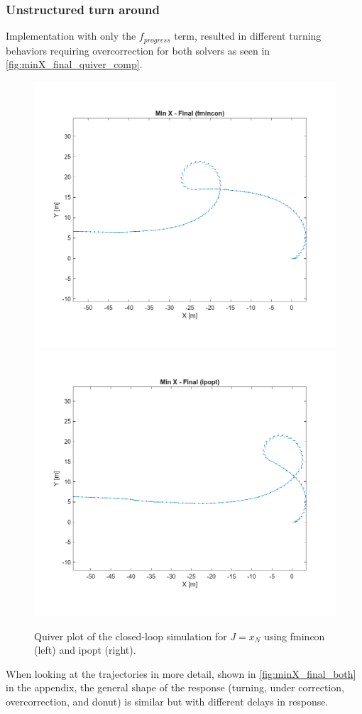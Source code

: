 \documentclass[]{IEEEtran}
\begin{document}
\subsubsection{Unstructured turn around}
Implementation with only the $f_{progress}$ term, resulted in different turning behaviors requiring overcorrection for both solvers as seen in \autoref{fig:minX_final_quiver_comp}.
\begin{figure}[h]
    \centering
    \includegraphics[width = 0.49\columnwidth]{figs/Min_X_-_Final_(fmincon)_quiver.png}
    \includegraphics[width = 0.49\columnwidth]{figs/Min_X_-_Final_(ipopt)_quiver.png}
    \caption{Quiver plot of the closed-loop simulation for $J = x_N$ using fmincon (left) and ipopt (right).}\label{fig:minX_final_quiver_comp}
\end{figure}
When looking at the trajectories in more detail, shown in \autoref{fig:minX_final_both} in the appendix, the general shape of the response (turning, under correction, overcorrection, and donut) is similar but with different delays in response.
\end{document}

